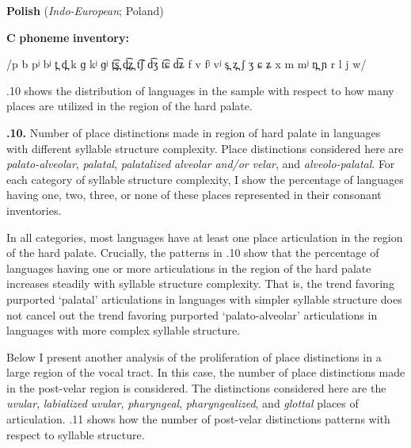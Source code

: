 \ea\label{ex:(4.32)}
   \textbf{Polish} (\textit{Indo-European}; Poland)



\textbf{C} \textbf{phoneme} \textbf{inventory:} 



/p b pʲ bʲ t̪ d̪ k ɡ kʲ ɡʲ t̪͡s̪ d̪͡z̪ t͡ʃ d͡ʒ t͡ɕ d͡ʑ f v fʲ vʲ s̪ z̪ ʃ ʒ ɕ ʑ x m mʲ n̪ ɲ r l j w/
\z



  .10 shows the distribution of languages in the sample with respect to how many places are utilized in the region of the hard palate.





\textbf{.10.} Number of place distinctions made in region of hard palate in languages with different syllable structure complexity. Place distinctions considered here are \textit{palato-alveolar}, \textit{palatal}, \textit{palatalized} \textit{alveolar} \textit{and/or} \textit{velar}, and \textit{alveolo-palatal}. For each category of syllable structure complexity, I show the percentage of languages having one, two, three, or none of these places represented in their consonant inventories.



  In all categories, most languages have at least one place articulation in the region of the hard palate. Crucially, the patterns in .10 show that the percentage of languages having one or more articulations in the region of the hard palate increases steadily with syllable structure complexity. That is, the trend favoring purported ‘palatal’ articulations in languages with simpler syllable structure does not cancel out the trend favoring purported ‘palato-alveolar’ articulations in languages with more complex syllable structure.



  Below I present another analysis of the proliferation of place distinctions in a large region of the vocal tract. In this case, the number of place distinctions made in the post-velar region is considered. The distinctions considered here are the \textit{uvular}, \textit{labialized} \textit{uvular}, \textit{pharyngeal}, \textit{pharyngealized}, and \textit{glottal} places of articulation. .11 shows how the number of post-velar distinctions patterns with respect to syllable structure.





